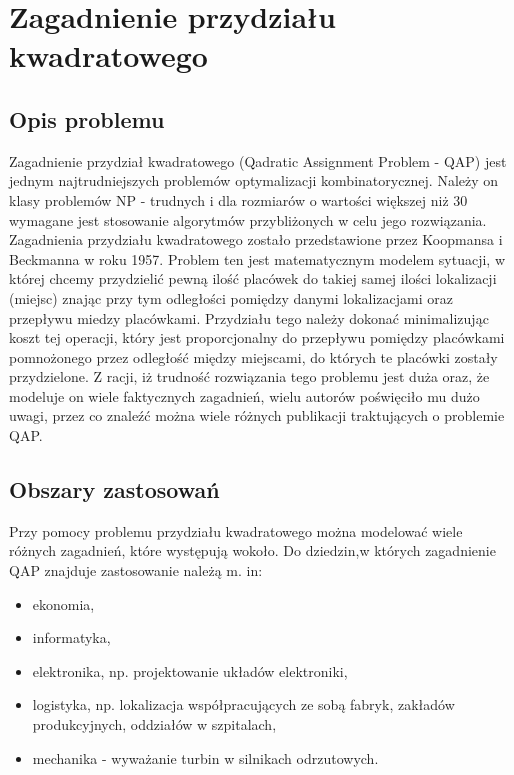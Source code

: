 \chapter{Zagadnienie przydziału kwadratowego}
\label{cha:qap}

\section{Opis problemu}
\label{sec:opis}
Zagadnienie przydział kwadratowego (Qadratic Assignment Problem - QAP) jest jednym najtrudniejszych problemów optymalizacji kombinatorycznej. Należy on klasy problemów NP - trudnych i dla rozmiarów o wartości większej niż 30 wymagane jest stosowanie algorytmów przybliżonych w celu jego rozwiązania. Zagadnienia przydziału kwadratowego zostało przedstawione przez Koopmansa i Beckmanna w roku 1957. Problem ten jest matematycznym modelem sytuacji, w której chcemy przydzielić pewną ilość placówek do takiej samej ilości lokalizacji (miejsc) znając przy tym odległości pomiędzy danymi lokalizacjami oraz przepływu miedzy placówkami. Przydziału tego należy dokonać minimalizując koszt tej operacji, który jest proporcjonalny do przepływu pomiędzy placówkami pomnożonego przez odległość między miejscami, do których te placówki zostały przydzielone. Z racji, iż trudność rozwiązania tego problemu jest duża oraz, że modeluje on wiele faktycznych zagadnień, wielu autorów poświęciło mu dużo uwagi, przez co znaleźć można wiele różnych publikacji traktujących o problemie QAP.

\section{Obszary zastosowań}
\label{sec:zastosowanie}
Przy pomocy problemu przydziału kwadratowego można modelować wiele różnych zagadnień, które występują wokoło. Do dziedzin,w których zagadnienie QAP znajduje zastosowanie należą m. in:
\begin{itemize}
\item ekonomia,
\item informatyka,
\item elektronika, np. projektowanie układów elektroniki,
\item logistyka, np. lokalizacja współpracujących ze sobą fabryk, zakładów produkcyjnych, oddziałów w szpitalach,
\item mechanika - wyważanie turbin w silnikach odrzutowych.
\end{itemize}